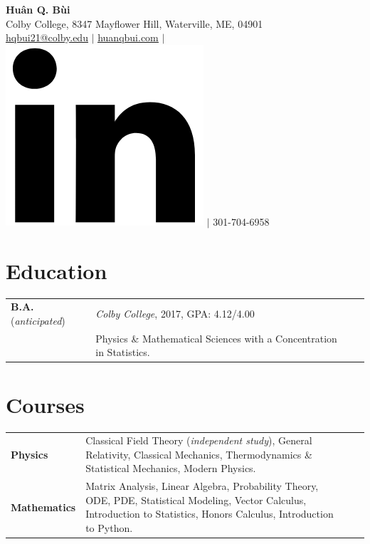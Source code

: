 \documentclass[a4paper, 10.5pt]{article}
\begin{document}
	\begin{center}
		{\LARGE\textbf{Hu\^{a}n Q. B\`{u}i}}\\
		\smallskip
		Colby College, 8347 Mayflower Hill, Waterville, ME, 04901\\ \href{mailto:hqbui21@colby.edu}{\underline{hqbui21@colby.edu}} $\vert$ \href{https://huanqbui.com}{\underline{huanqbui.com}} $\vert$ \href{https://www.linkedin.com/in/huan-bui/}{\includegraphics[scale=0.04]{linkedin_logo.PNG}} $\vert$ 301-704-6958
	\end{center}
	\section*{\normalsize{{\color{colby}Education}}}
		\begin{tabular}{lp{12.5cm}lp{8in}}
			\textbf{B.A.} (\textit{anticipated}) & \textit{Colby College}, 2017\textemdash 2021, GPA: 4.12/4.00\\ & Physics \& Mathematical Sciences with a Concentration in Statistics.\\
		\end{tabular}
	\section*{\normalsize{{\color{colby}Courses}}}
	\begin{tabular}{lp{13.5cm}lp{2in}}
		\textbf{Physics} 
		& Classical Field Theory (\textit{independent study}), General Relativity, Classical Mechanics, Thermodynamics \& Statistical Mechanics, Modern Physics.\\
		
		\textbf{Mathematics} 
		&  Matrix Analysis, Linear Algebra, Probability Theory, ODE, PDE, Statistical Modeling, Vector Calculus, Introduction to Statistics, Honors Calculus, Introduction to Python.\\
	\end{tabular}
\end{document}
